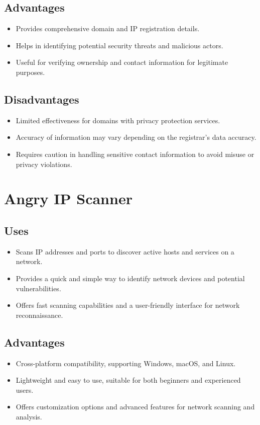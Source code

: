 \documentclass[11pt]{article}
\begin{document}
\subsection{Advantages}
\begin{itemize}
    \item Provides comprehensive domain and IP registration details.
    \item Helps in identifying potential security threats and malicious actors.
    \item Useful for verifying ownership and contact information for legitimate purposes.
\end{itemize}

\subsection{Disadvantages}
\begin{itemize}
    \item Limited effectiveness for domains with privacy protection services.
    \item Accuracy of information may vary depending on the registrar's data accuracy.
    \item Requires caution in handling sensitive contact information to avoid misuse or privacy violations.
\end{itemize}

\section{Angry IP Scanner}

\subsection{Uses}
\begin{itemize}
    \item Scans IP addresses and ports to discover active hosts and services on a network.
    \item Provides a quick and simple way to identify network devices and potential vulnerabilities.
    \item Offers fast scanning capabilities and a user-friendly interface for network reconnaissance.
\end{itemize}

\subsection{Advantages}
\begin{itemize}
    \item Cross-platform compatibility, supporting Windows, macOS, and Linux.
    \item Lightweight and easy to use, suitable for both beginners and experienced users.
    \item Offers customization options and advanced features for network scanning and analysis.
\end{itemize}
\end{document}
